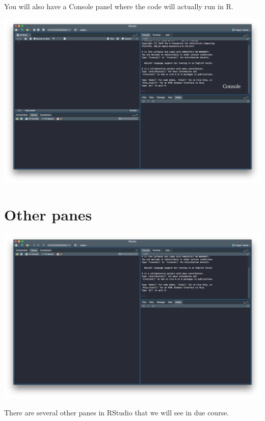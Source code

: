 \documentclass[12pt,letterpaperpaper,openany]{book}
\begin{document}
You will also have a Console panel where the code will actually run in R.

\includegraphics{img/ConsolePanel.png}

\hypertarget{other-panes}{%
\section*{Other panes}\label{other-panes}}

\includegraphics{img/RStudio.png}

There are several other panes in RStudio that we will see in due course.
\end{document}
